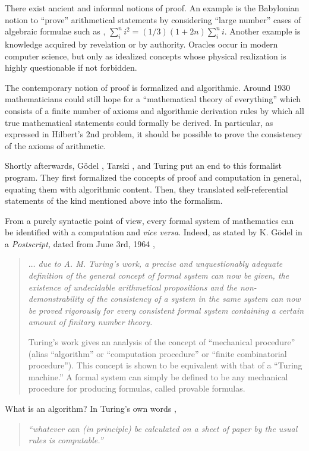\documentclass[rmp,amsfonts,showpacs,showkeys]{revtex4}
\begin{document}
There exist ancient and informal notions of proof.
An example \cite{baats1} is the Babylonian notion to ``prove'' arithmetical statements
by considering ``large number'' cases
of algebraic formulae such as \cite[Chapter V]{neugeb},
$\sum_i^n i^2 = (1/3)(1+2n)\sum_i^n i$.
Another example  is knowledge acquired by revelation or by authority.
Oracles occur in modern computer science,
but only as idealized concepts whose physical realization is highly
questionable if not forbidden.

The contemporary notion of proof is formalized and algorithmic.
Around 1930 mathematicians could still hope for a
``mathematical theory of everything''
which consists of a finite number of axioms and algorithmic derivation rules
by which all true mathematical statements could formally be derived.
In particular, as expressed in Hilbert's 2nd problem,
it should be possible to prove the consistency of the axioms of arithmetic.

Shortly afterwards, G\"odel \cite{godel1}, Tarski \cite{tarski:32}, and Turing
\cite{turing-36} put an end to this formalist program.
They first formalized the concepts of proof and computation in general,
equating them with algorithmic content.
Then, they translated self-referential statements of the
kind mentioned above into the formalism.


From a purely syntactic point of view,
every formal system of mathematics  can be identified with a computation
and {\it vice versa}.
Indeed, as stated by K. G\"odel in a {\sl Postscript,} dated from  June 3rd, 1964 \cite[pp. 369-370]{godel-ges1},
 \begin{quote}
 {\em
 $\ldots $ due to A. M. Turing's work,
 a precise and unquestionably
 adequate definition of the general concept of formal system can now be
 given, the existence of undecidable arithmetical propositions and the
 non-demonstrability of the consistency of a system in the same system
 can now be proved rigorously for {\em every} consistent formal system
 containing a certain amount of finitary number theory.

 Turing's work gives an analysis of the
 concept of ``mechanical
 procedure'' (alias ``algorithm'' or ``computation procedure'' or
 ``finite combinatorial procedure''). This concept is shown to be
 equivalent with that of a ``Turing machine.'' A formal system can
 simply be defined to be any mechanical procedure for producing
 formulas, called provable formulas.}
 \end{quote}

What is an algorithm? In Turing's own words \cite{turing-36},
 \begin{quote}
{\em
``whatever  can (in principle) be calculated on a
 sheet of paper by  the usual rules is  computable.''}
\end{quote}
\end{document}
